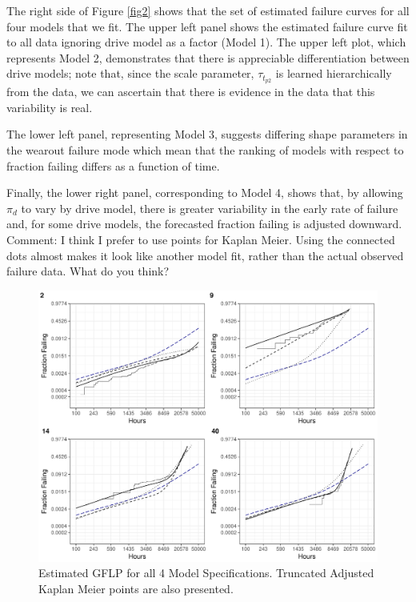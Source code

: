 \documentclass[12pt]{article}
\begin{document}
The right side of Figure \ref{fig2} shows that the set of estimated failure curves for all four models that we fit. The upper left panel shows the estimated failure curve fit to all data ignoring drive model as a factor (Model 1). The upper left plot, which represents Model 2, demonstrates that there is appreciable differentiation between drive models; note that, since the scale parameter, $\tau_{t_{p2}}$ is learned hierarchically from the data, we can ascertain that there is evidence in the data that this variability is real.

The lower left panel, representing Model 3, suggests differing shape parameters in the wearout failure mode which mean that the ranking of models with respect to fraction failing differs as a function of time.

Finally, the lower right panel, corresponding to Model 4, shows that, by allowing $\pi_d$ to vary by drive model, there is greater variability in the early rate of failure and, for some drive models, the forecasted fraction failing is adjusted downward. 
\\
Comment: I think I prefer to use points for Kaplan Meier.  Using the connected dots almost makes it look like another model fit, rather than the actual observed failure data.  What do you think? \\

\begin{figure}[H]
    \centering
   \includegraphics[width=5.0in]{fig/brand_compare_nobands.pdf}
		\caption{Estimated GFLP for all 4 Model Specifications.  Truncated Adjusted Kaplan Meier points are also presented.    \label{fig:first}} 
\end{figure}
\end{document}
